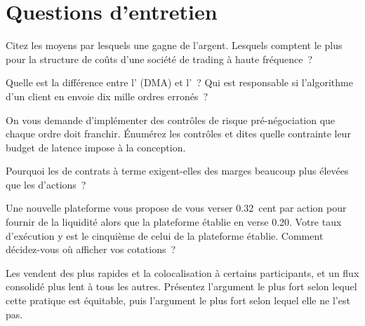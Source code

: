 \section{Questions d'entretien}

\begin{interviewq}\label{iq:m1:exchanges-brokers-venues:1}
Citez les moyens par lesquels une  gagne de l'argent. Lesquels comptent le plus pour
la structure de coûts d'une société de trading à haute fréquence~?
\end{interviewq}

\begin{interviewq}\label{iq:m1:exchanges-brokers-venues:2}
Quelle est la différence entre l' (DMA) et l'~?
Qui est responsable si l'algorithme d'un client en  envoie dix mille
ordres erronés~?
\end{interviewq}

\begin{interviewq}\label{iq:m1:exchanges-brokers-venues:3}
On vous demande d'implémenter des contrôles de risque pré-négociation que chaque ordre doit franchir.
Énumérez les contrôles et dites quelle contrainte leur budget de latence impose
à la conception.
\end{interviewq}

\begin{interviewq}\label{iq:m1:exchanges-brokers-venues:4}
Pourquoi les  de contrats à terme exigent-elles des marges beaucoup plus élevées que les  d'actions~?
\end{interviewq}

\begin{interviewq}\label{iq:m1:exchanges-brokers-venues:5}
Une nouvelle plateforme vous propose de vous verser 0.32~cent par action pour fournir de la liquidité alors que
la plateforme établie en verse 0.20. Votre taux d'exécution y est le cinquième de
celui de la plateforme établie. Comment décidez-vous où afficher vos cotations~?
\end{interviewq}

\begin{interviewq}\label{iq:m1:exchanges-brokers-venues:6}
Les  vendent des  plus rapides et la colocalisation à certains participants, et un
flux consolidé plus lent à tous les autres. Présentez l'argument le plus fort selon lequel
cette pratique est équitable, puis l'argument le plus fort selon lequel elle ne l'est pas.
\end{interviewq}
